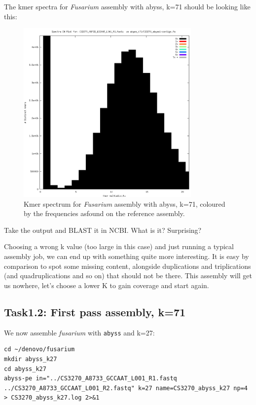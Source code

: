 The kmer spectra for \textit{Fusarium} assembly with abyss, k=71 should be looking like this:
\begin{figure}[H]
\centering
\includegraphics[width=0.8\textwidth]{handout/abyss-k71.png}
\caption{Kmer spectrum for \textit{Fusarium} assembly with abyss, k=71, coloured by the frequencies asfound on the reference assembly.}
\label{fig:fusariumk71}
\end{figure}

Take the output and BLAST it in NCBI. What is it? Surprising?

\begin{steps}
\end{steps}

Choosing a wrong k value (too large in this case) and just running a typical assembly job, we can end up with something quite more interesting. It is easy by comparison to spot some missing content, alongside duplications and triplications (and quadruplications and so on) that should not be there.
This assembly will get us nowhere, let's choose a lower K to gain coverage and start again.

\subsection{Task1.2: First pass assembly, k=71}
\begin{steps}
We now assemble \textit{fusarium} with \texttt{abyss} and k=27:
\begin{lstlisting}
cd ~/denovo/fusarium
mkdir abyss_k27
cd abyss_k27
abyss-pe in="../CS3270_A8733_GCCAAT_L001_R1.fastq ../CS3270_A8733_GCCAAT_L001_R2.fastq" k=27 name=CS3270_abyss_k27 np=4 > CS3270_abyss_k27.log 2>&1
\end{lstlisting}
\end{steps}


